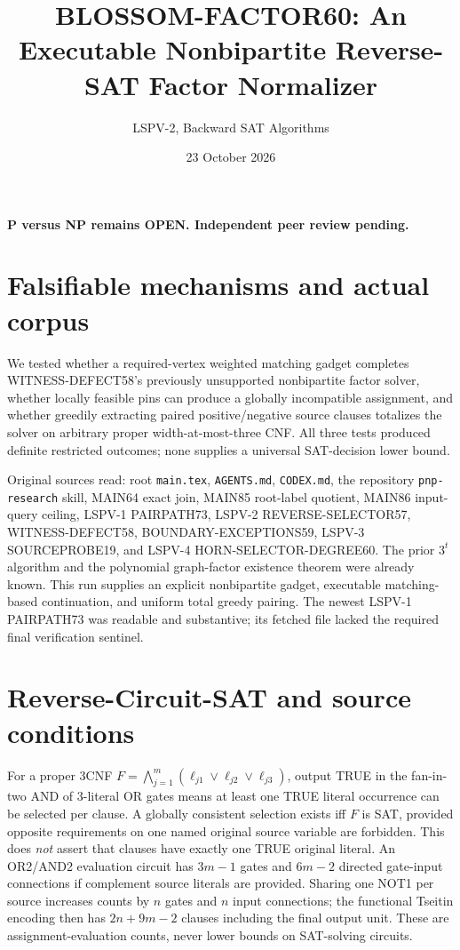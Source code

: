 \documentclass[11pt]{article}
\title{BLOSSOM-FACTOR60: An Executable Nonbipartite Reverse-SAT Factor Normalizer}
\author{LSPV-2, Backward SAT Algorithms}
\date{23 October 2026}
\begin{document}
\maketitle
\begin{center}\textbf{P versus NP remains OPEN. Independent peer review pending.}\end{center}

\section{Falsifiable mechanisms and actual corpus}
We tested whether a required-vertex weighted matching gadget completes WITNESS-DEFECT58's previously unsupported nonbipartite factor solver, whether locally feasible pins can produce a globally incompatible assignment, and whether greedily extracting paired positive/negative source clauses totalizes the solver on arbitrary proper width-at-most-three CNF. All three tests produced definite restricted outcomes; none supplies a universal SAT-decision lower bound.

Original sources read: root \texttt{main.tex}, \texttt{AGENTS.md}, \texttt{CODEX.md}, the repository \texttt{pnp-research} skill, MAIN64 exact join, MAIN85 root-label quotient, MAIN86 input-query ceiling, LSPV-1 PAIRPATH73, LSPV-2 REVERSE-SELECTOR57, WITNESS-DEFECT58, BOUNDARY-EXCEPTIONS59, LSPV-3 SOURCEPROBE19, and LSPV-4 HORN-SELECTOR-DEGREE60. The prior $3^t$ algorithm and the polynomial graph-factor existence theorem were already known. This run supplies an explicit nonbipartite gadget, executable matching-based continuation, and uniform total greedy pairing. The newest LSPV-1 PAIRPATH73 was readable and substantive; its fetched file lacked the required final verification sentinel.

\section{Reverse-Circuit-SAT and source conditions}
For a proper 3CNF $F=\bigwedge_{j=1}^m(\ell_{j1}\vee\ell_{j2}\vee\ell_{j3})$, output TRUE in the fan-in-two AND of 3-literal OR gates means at least one TRUE literal occurrence can be selected per clause. A globally consistent selection exists iff $F$ is SAT, provided opposite requirements on one named original source variable are forbidden. This does \emph{not} assert that clauses have exactly one TRUE original literal. An OR2/AND2 evaluation circuit has $3m-1$ gates and $6m-2$ directed gate-input connections if complement source literals are provided. Sharing one NOT1 per source increases counts by $n$ gates and $n$ input connections; the functional Tseitin encoding then has $2n+9m-2$ clauses including the final output unit. These are assignment-evaluation counts, never lower bounds on SAT-solving circuits.
\end{document}
